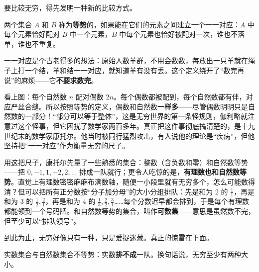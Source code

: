 要比较无穷，得先发明一种新的比较方式。

\begin{dingyi}[等势]
两个集合 $A$ 和 $B$ 称为\textbf{等势}的，如果能在它们的元素之间建立一个一一对应：$A$ 中每个元素恰好配对 $B$ 中一个元素，$B$ 中每个元素也恰好被配对一次，谁也不落单，谁也不重复。
\end{dingyi}

一一对应是个古老得多的想法：原始人数羊群，不用会数数，每放出一只羊就在绳子上打一个结，羊和结一一对应，就知道羊有没有丢。这个定义绕开了“数完再说”的麻烦——它\textbf{不要求数完}。

\begin{center}
\end{center}

看上图：每个自然数 $n$ 配对偶数 $2n$。每个偶数都被配到，每个自然数都有伴，对应严丝合缝。所以按照等势的定义，偶数和自然数\textbf{一样多}——尽管偶数明明只是自然数的一部分！“部分可以等于整体”，这是无穷世界的第一条怪规则，伽利略就注意过这个怪事，但它困扰了数学家两百多年。真正把这件事彻底搞清楚的，是十九世纪末的数学家康托尔。他当时被同行猛烈攻击，有人说他的理论是“疾病”，但他坚持把“一一对应”作为衡量无穷的尺子。

用这把尺子，康托尔先量了一些熟悉的集合：整数（含负数和零）和自然数等势——把 $0, -1, 1, -2, 2, \ldots$ 排成一队就行；更令人吃惊的是，\textbf{有理数也和自然数等势}。直觉上有理数密密麻麻布满数轴，随便一小段里就有无穷多个，怎么可能数得清？但可以把所有正分数按“分子加分母”的大小分组排队：先是和为 $2$ 的 $\frac{1}{1}$，再是和为 $3$ 的 $\frac{1}{2}, \frac{2}{1}$，再是和为 $4$ 的 $\frac{1}{3}, \frac{2}{2}, \frac{3}{1}$……每个分数迟早都会排到，于是每个有理数都能领到一个号码牌。和自然数等势的集合，叫作\textbf{可数集}——意思是虽然数不完，但至少可以“排队领号”。

到此为止，无穷好像只有一种，只是爱捉迷藏。真正的惊雷在下面。

\begin{dingli}[康托尔对角线定理]
实数集合与自然数集合不等势：实数\textbf{排不成}一队。换句话说，无穷至少有两种大小。
\end{dingli}

